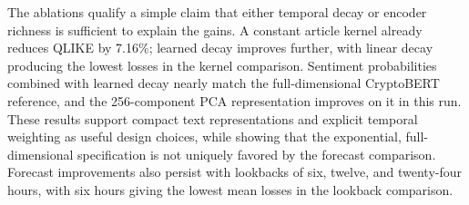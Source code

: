 The ablations qualify a simple claim that either temporal decay or
encoder richness is sufficient to explain the gains. A constant
article kernel already reduces QLIKE by 7.16\%; learned decay
improves further, with linear decay producing the lowest losses in
the kernel comparison. Sentiment probabilities combined with learned
decay nearly match the full-dimensional CryptoBERT reference, and
the 256-component PCA representation improves on it in this run.
These results support compact text representations and explicit
temporal weighting as useful design choices, while showing that
the exponential, full-dimensional specification is not uniquely
favored by the forecast comparison.
Forecast improvements also persist with lookbacks of six, twelve,
and twenty-four hours, with six hours giving the lowest mean losses
in the lookback comparison.
